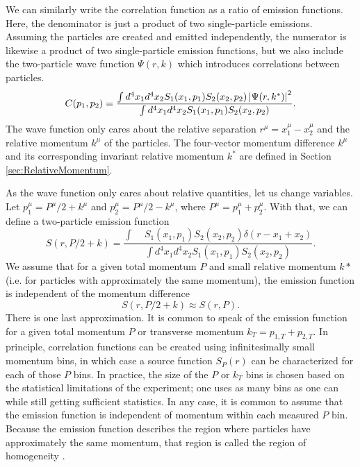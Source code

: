 We can similarly write the correlation function as a ratio of emission functions.
Here, the denominator is just a product of two single-particle emissions.
Assuming the particles are created and emitted independently, the numerator is likewise a product of two single-particle emission functions, but we also include the two-particle wave function $\Psi(r,k)$ which introduces correlations between particles.
\begin{equation}
\label{eq:BiggerKooninPratt}
C(p_1,p_2) = \frac{\int d^4x_1d^4x_2 S_1(x_1,p_1) S_2(x_2,p_2)\left\lvert\Psi(r,k^*)\right\rvert^2}{\int d^4x_1d^4x_2 S_1(x_1,p_1) S_2(x_2,p_2)}.
\end{equation}
The wave function only cares about the relative separation $r^\mu = x_1^\mu - x_2^\mu$ and the relative momentum $k^\mu$ of the particles. 
The four-vector momentum difference $k^\mu$ and its corresponding invariant relative momentum $k^*$ are defined in Section \ref{sec:RelativeMomentum}.

As the wave function only cares about relative quantities, let us change variables.
Let $p_1^\mu = P^\mu/2 + k^\mu$ and $p_2^\mu = P^\mu/2 - k^\mu$, where $P^\mu = p_1^\mu + p_2^\mu$.
With that, we can define a two-particle emission function
\begin{equation}
\label{eq:TwoParticleEmissionFunction}
S(r, P/2 + k)=\frac{\int\mathop{d^4x_1}\mathop{d^4x_2}S_1(x_1,p_1) S_2(x_2,p_2)\delta(r - x_1 +x_2)}{\int d^4x_1d^4x_2 S_1(x_1,p_1) S_2(x_2,p_2)}.
\end{equation}
We assume that for a given total momentum $P$ and small relative momentum $k*$ (i.e. for particles with approximately the same momentum), the emission function is independent of the momentum difference
\begin{equation}
S(r,P/2+k) \approx S(r,P).
\end{equation}
There is one last approximation. It is common to speak of the emission function for a given total momentum $P$ or transverse momentum $k_T = p_{1,T} + p_{2,T}$.
In principle, correlation functions can be created using infinitesimally small momentum bins, in which case a source function $S_P(r)$ can be characterized for each of those $P$ bins.
In practice, the size of the $P$ or $k_T$ bins is chosen based on the statistical limitations of the experiment; one uses as many bins as one can while still getting sufficient statistics.
In any case, it is common to assume that the emission function is independent of momentum within each measured $P$ bin.
Because the emission function describes the region where particles have approximately the same momentum, that region is called the region of homogeneity \cite{Akkelin:1995gh}.

